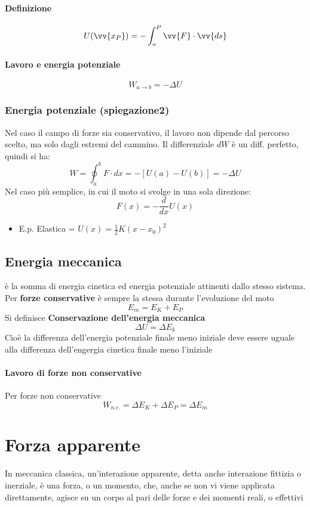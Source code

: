 \documentclass[a4paper]{report}
\begin{document}
  \paragraph{Definizione}
  $$ U(\vv{x_P}) = - \int_o^P \vv{F}\cdot \vv{ds} $$
  \paragraph{Lavoro e energia potenziale}
  $$ W_{a\rightarrow b} = -\Delta U $$

  \subsubsection{Energia potenziale (spiegazione2)}
  Nel caso il campo di forze sia conservativo, il lavoro non dipende dal percorso scelto, ma solo dagli estremi del cammino. Il differenziale $dW$ è un diff. perfetto, quindi si ha:
  $$W = \oint_a^b F \cdot dx = -[U(a) - U(b)] = -\Delta U$$
  Nel caso più semplice, in cui il moto si svolge in una sola direzione:
  $$ F(x) = -\frac{d}{dx}U(x) $$
  \begin{itemize}
    \item E.p. Elastica = \( U(x) = \frac{1}{2} K (x-x_0 )^2 \)
  \end{itemize}

  \subsection{Energia meccanica}
  è la somma di energia cinetica ed energia potenziale attinenti dallo stesso sistema.\\
  Per \textbf{forze conservative} è sempre la stessa durante l'evoluzione del moto
  $$ E_m = E_K + E_P $$
  Si definisce \textbf{Conservazione dell'energia meccanica}
  $$ \Delta U = \Delta E_k$$
  Cioè la differenza dell'energia potenziale finale meno iniziale  deve essere uguale alla differenza dell'engergia cinetica finale meno l'iniziale
  \paragraph{Lavoro di forze non conservative}
  Per forze non conservative
  $$ W_{n.c.} = \Delta E_K + \Delta E_P = \Delta E_m $$

  \section{Forza apparente}
  In meccanica classica, un'interazione apparente, detta anche interazione fittizia o inerziale, è una forza, o un momento, che, anche se non vi viene applicata direttamente, agisce su un corpo al pari delle forze e dei momenti reali, o effettivi
\end{document}
